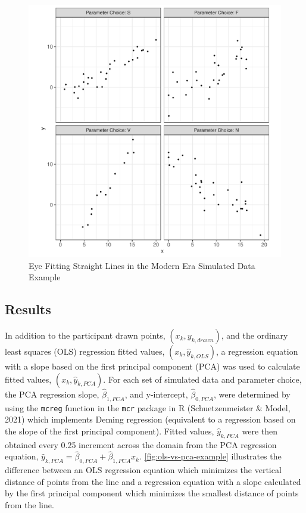 \documentclass[print]{nuthesis}
\begin{document}
\begin{figure}[tbp]

{\centering \includegraphics[width=1\linewidth,]{thesis_files/figure-latex/eyefitting-simplot-1} 

}

\caption{Eye Fitting Straight Lines in the Modern Era Simulated Data Example}\label{fig:eyefitting-simplot}
\end{figure}

\hypertarget{results-1}{%
\subsection{Results}\label{results-1}}

In addition to the participant drawn points, \((x_k, y_{k,drawn})\), and the ordinary least squares (OLS) regression fitted values, \((x_k, \hat y_{k,OLS})\), a regression equation with a slope based on the first principal component (PCA) was used to calculate fitted values, \((x_k, \hat y_{k,PCA})\).
For each set of simulated data and parameter choice, the PCA regression slope, \(\hat\beta_{1,PCA}\), and y-intercept, \(\hat\beta_{0,PCA}\), were determined by using the \texttt{mcreg} function in the \texttt{mcr} package in R (Schuetzenmeister \& Model, 2021) which implements Deming regression (equivalent to a regression based on the slope of the first principal component).
Fitted values, \(\hat y_{k,PCA}\) were then obtained every 0.25 increment across the domain from the PCA regression equation, \(\hat y_{k,PCA} = \hat\beta_{0,PCA} + \hat\beta_{1,PCA} x_k\).
\cref{fig:ols-vs-pca-example} illustrates the difference between an OLS regression equation which minimizes the vertical distance of points from the line and a regression equation with a slope calculated by the first principal component which minimizes the smallest distance of points from the line.
\end{document}
